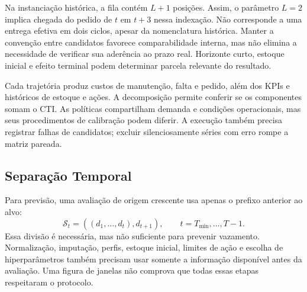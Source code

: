 Na instanciação histórica, a fila contém $L+1$ posições. Assim, o parâmetro $L=2$ implica chegada do pedido de $t$ em $t+3$ nessa indexação. Não corresponde a uma entrega efetiva em dois ciclos, apesar da nomenclatura histórica. Manter a convenção entre candidatos favorece comparabilidade interna, mas não elimina a necessidade de verificar sua aderência ao prazo real. Horizonte curto, estoque inicial e efeito terminal podem determinar parcela relevante do resultado.

Cada trajetória produz custos de manutenção, falta e pedido, além dos KPIs e históricos de estoque e ações. A decomposição permite conferir se os componentes somam o CTI. As políticas compartilham demanda e condições operacionais, mas seus procedimentos de calibração podem diferir. A execução também precisa registrar falhas de candidatos; excluir silenciosamente séries com erro rompe a matriz pareada.

\subsection{Separação Temporal}
\label{sec:wf_protocol}

Para previsão, uma avaliação de origem crescente usa apenas o prefixo anterior ao alvo:
\begin{equation}
\mathcal S_t=((d_1,\ldots,d_t),d_{t+1}),\qquad t=T_{\min},\ldots,T-1.
\label{eq:wf_splits}
\end{equation}
Essa divisão é necessária, mas não suficiente para prevenir vazamento. Normalização, imputação, perfis, estoque inicial, limites de ação e escolha de hiperparâmetros também precisam usar somente a informação disponível antes da avaliação. Uma figura de janelas não comprova que todas essas etapas respeitaram o protocolo.

